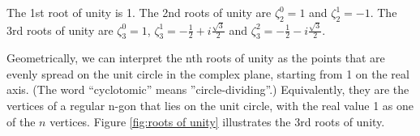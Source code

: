 \documentclass[../main.tex]{subfiles}
\begin{document}

\begin{example}
The 1st root of unity is 1. The 2nd roots of unity are $\zeta_2^0=1$ and $\zeta_2^1=-1$. The 3rd roots of unity are $\zeta_3^0=1$, $\zeta_3^1=-\frac{1}{2}+i\frac{\sqrt{3}}{2}$ and $\zeta_3^2=-\frac{1}{2}-i\frac{\sqrt{3}}{2}$.
\end{example}

Geometrically, we can interpret the nth roots of unity as the points that are evenly spread on the unit circle in the complex plane, starting from 1 on the real axis. (The word ``cyclotomic'' means ''circle-dividing''.) Equivalently, they are the vertices of a regular n-gon that lies on the unit circle, with the real value 1 as one of the $n$ vertices.  Figure \ref{fig:roots of unity} illustrates the 3rd roots of unity. 
\end{document}
